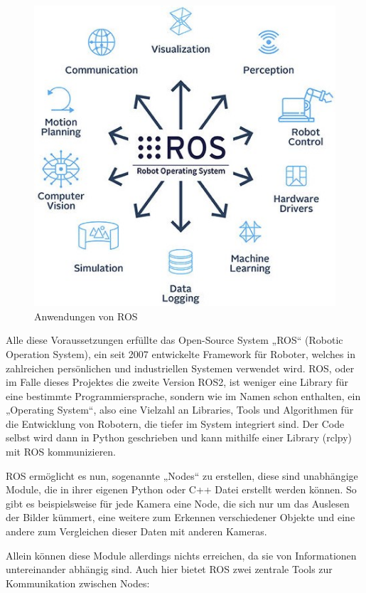 \documentclass[12pt, ngerman]{article}
\begin{document}
\begin{figure}
\centering
  \includegraphics[angle=0,width=\linewidth]{ROS_diagram.jpg}
  \caption{Anwendungen von ROS}
\end{figure}
Alle diese Voraussetzungen erfüllte das Open-Source System „ROS“ (Robotic Operation System), ein seit 2007 entwickelte Framework für Roboter, welches in zahlreichen persönlichen und industriellen Systemen verwendet wird. ROS, oder im Falle dieses Projektes die zweite Version ROS2, ist weniger eine Library für eine bestimmte Programmiersprache, sondern wie im Namen schon enthalten, ein „Operating System“, also eine Vielzahl an Libraries, Tools und Algorithmen für die Entwicklung von Robotern, die tiefer im System integriert sind. Der Code selbst wird dann in Python geschrieben und kann mithilfe einer Library (rclpy) mit ROS kommunizieren. 

ROS ermöglicht es nun, sogenannte „Nodes“ zu erstellen, diese sind unabhängige Module, die in ihrer eigenen Python oder C++ Datei erstellt werden können. So gibt es beispielsweise für jede Kamera eine Node, die sich nur um das Auslesen der Bilder kümmert, eine weitere zum Erkennen verschiedener Objekte und eine andere zum Vergleichen dieser Daten mit anderen Kameras.  

Allein können diese Module allerdings nichts erreichen, da sie von Informationen untereinander abhängig sind. Auch hier bietet ROS zwei zentrale Tools zur Kommunikation zwischen Nodes:  
\end{document}

